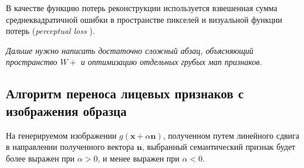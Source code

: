 В качестве функцию потерь реконструкции используется взвешенная сумма среднеквадратичной ошибки в пространстве пикселей и визуальной функции потерь (\emph{perceptual loss} \cite{Johnson2016Perceptual}).

\emph{Дальше нужно написать достаточно сложный абзац, объясняющий пространство $W+$ и оптимизацию отдельных грубых мап признаков.}


\subsection{Алгоритм переноса лицевых признаков с изображения образца}

На генерируемом изображении $g(\mathbf x + \alpha \mathbf n)$, полученном путем линейного сдвига в направлении полученного вектора $\mathbf n$, выбранный семантический признак будет более выражен при $\alpha > 0$, и менее выражен при $\alpha  < 0$.

